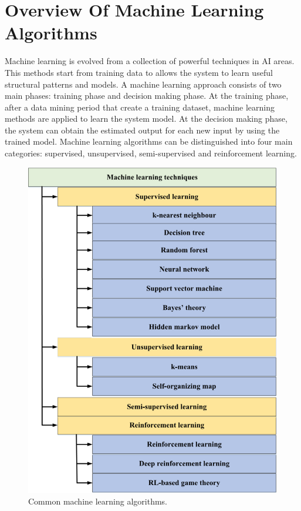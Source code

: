\section{Overview Of Machine Learning Algorithms} \label{sec:ML_BGK}
Machine learning is evolved from a collection of powerful techniques in AI areas. This methods start from training data to allows the system to learn useful structural patterns and models. A machine learning approach consists of two main phases: training phase and decision making phase. At the training phase, after a data mining period that create a training dataset, machine learning methods are applied to learn the system model. At the decision making phase, the system can obtain the estimated output for each new input by using the trained model.
Machine learning algorithms can be distinguished into four main categories: supervised, unsupervised, semi-supervised and reinforcement learning.
\begin{figure}[tb!]
	\centering
	\includegraphics[width=13cm]{figure/ML_algo.png}
	\caption{Common machine learning algorithms.}
	\label{fig:{ML_algo}}
\end{figure}
